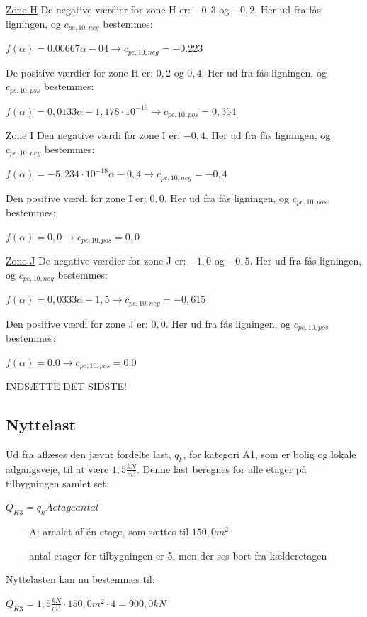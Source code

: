 \underline{Zone H}
\newline
De negative værdier for zone H er: $-0,\!3$ og $-0,\!2$. Her ud fra fås ligningen, og $c_{pe,10,neg}$ bestemmes:
\begin{center}
	$f(\alpha)=0.00667\alpha - 0\!4 \to c_{pe,10,neg}=-0.223$
\end{center}
De positive værdier for zone H er: $0,\!2$ og $0,\!4$. Her ud fra fås ligningen, og $c_{pe,10,pos}$ bestemmes:
\begin{center}
	$f(\alpha)=0,\!0133\alpha - 1,\!178\cdot 10^{-16} \to c_{pe,10,pos}=0,\!354$
\end{center}

\underline{Zone I}
\newline
Den negative værdi for zone I er: $-0,\!4$. Her ud fra fås ligningen, og $c_{pe,10,neg}$ bestemmes:
\begin{center}
	$f(\alpha)=-5,\!234\cdot 10^{-18}\alpha - 0,\!4 \to c_{pe,10,neg}=-0,\!4$
\end{center}
Den positive værdi for zone I er: $0,\!0$. Her ud fra fås ligningen, og $c_{pe,10,pos}$ bestemmes:
\begin{center}
	$f(\alpha)=0,\!0 \to c_{pe,10,pos}=0,\!0$
\end{center}

\underline{Zone J}
\newline
De negative værdier for zone J er: $-1,\!0$ og $-0,\!5$. Her ud fra fås ligningen, og $c_{pe,10,neg}$ bestemmes:
\begin{center}
	$f(\alpha)=0,\!0333\alpha - 1,\!5 \to c_{pe,10,neg}=-0,\!615$
\end{center}
Den positive værdi for zone J er: $0,\!0$. Her ud fra fås ligningen, og $c_{pe,10,pos}$ bestemmes:
\begin{center}
	$f(\alpha)=0.0 \to c_{pe,10,pos}=0.0$
\end{center}
INDSÆTTE DET SIDSTE!

\subsection{Nyttelast}
Ud fra \citep[ tabel 6.2 kapitel 6.3.1.2]{EU91} aflæses den jævnt fordelte last, $q_k$, for kategori A1, som er bolig og lokale adgangsveje, til at være $1,\!5 \frac{kN}{m^2}$. Denne last beregnes for alle etager på tilbygningen samlet set.
\begin{center}
	$Q_{K3}=q_k A etageantal$
\end{center}
\begin{itemize}
	\item[-] A: arealet af én etage, som sættes til $150,\!0 m^2$
	\item[-] antal etager for tilbygningen er 5, men der ses bort fra kælderetagen
\end{itemize}
Nyttelasten kan nu bestemmes til:
\begin{center}
	$Q_{K3}=1,\!5 \frac{kN}{m^2}\cdot 150,\!0 m^2\cdot 4=900,\!0 kN$
\end{center}

